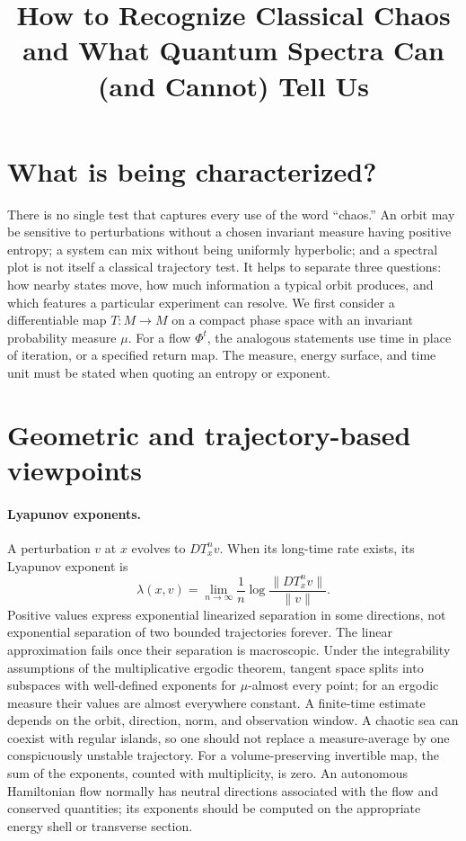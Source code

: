 \documentclass[11pt,a4paper]{article}
\begin{document}
\title{How to Recognize Classical Chaos\\and What Quantum Spectra Can (and Cannot) Tell Us}
\author{}
\date{}
\maketitle

\section*{What is being characterized?}
There is no single test that captures every use of the word ``chaos.'' An orbit may be sensitive to perturbations without a chosen invariant measure having positive entropy; a system can mix without being uniformly hyperbolic; and a spectral plot is not itself a classical trajectory test. It helps to separate three questions: how nearby states move, how much information a typical orbit produces, and which features a particular experiment can resolve. We first consider a differentiable map $T:M\to M$ on a compact phase space with an invariant probability measure $\mu$. For a flow $\Phi^t$, the analogous statements use time in place of iteration, or a specified return map. The measure, energy surface, and time unit must be stated when quoting an entropy or exponent.

\section*{Geometric and trajectory-based viewpoints}
\paragraph{Lyapunov exponents.} A perturbation $v$ at $x$ evolves to $DT_x^n v$. When its long-time rate exists, its Lyapunov exponent is
\[\lambda(x,v)=\lim_{n\to\infty}\frac{1}{n}\log\frac{\|DT_x^n v\|}{\|v\|}.\]
Positive values express exponential linearized separation in some directions, not exponential separation of two bounded trajectories forever. The linear approximation fails once their separation is macroscopic. Under the integrability assumptions of the multiplicative ergodic theorem, tangent space splits into subspaces with well-defined exponents for $\mu$-almost every point; for an ergodic measure their values are almost everywhere constant. A finite-time estimate depends on the orbit, direction, norm, and observation window. A chaotic sea can coexist with regular islands, so one should not replace a measure-average by one conspicuously unstable trajectory. For a volume-preserving invertible map, the sum of the exponents, counted with multiplicity, is zero. An autonomous Hamiltonian flow normally has neutral directions associated with the flow and conserved quantities; its exponents should be computed on the appropriate energy shell or transverse section.
\end{document}

